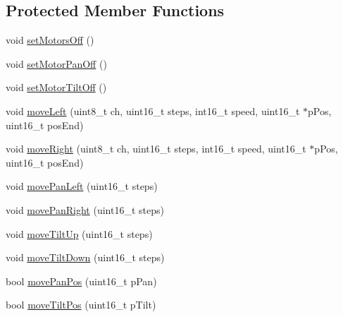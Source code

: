 \subsection*{Protected Member Functions}
\begin{DoxyCompactItemize}
\item 
void \hyperlink{classft_1_1_txt_pan_tilt_unit_a10a3340d1175128af17600aee6d208f5}{set\+Motors\+Off} ()
\item 
void \hyperlink{classft_1_1_txt_pan_tilt_unit_aa6e90052736e2260d5336e6e45625790}{set\+Motor\+Pan\+Off} ()
\item 
void \hyperlink{classft_1_1_txt_pan_tilt_unit_ae60c0c9c8e5a9f12b527d9c5c6c01e21}{set\+Motor\+Tilt\+Off} ()
\item 
void \hyperlink{classft_1_1_txt_pan_tilt_unit_a592992fb1f782c3a85bf43b2b812d1c1}{move\+Left} (uint8\+\_\+t ch, uint16\+\_\+t steps, int16\+\_\+t speed, uint16\+\_\+t $\ast$p\+Pos, uint16\+\_\+t pos\+End)
\item 
void \hyperlink{classft_1_1_txt_pan_tilt_unit_a6d00615d078b7fe284b08c50214ea9e8}{move\+Right} (uint8\+\_\+t ch, uint16\+\_\+t steps, int16\+\_\+t speed, uint16\+\_\+t $\ast$p\+Pos, uint16\+\_\+t pos\+End)
\item 
void \hyperlink{classft_1_1_txt_pan_tilt_unit_a947bff817236114544e5577d56c115b5}{move\+Pan\+Left} (uint16\+\_\+t steps)
\item 
void \hyperlink{classft_1_1_txt_pan_tilt_unit_ab44bf3e2be81f6d26a0dfc8f6f2b6483}{move\+Pan\+Right} (uint16\+\_\+t steps)
\item 
void \hyperlink{classft_1_1_txt_pan_tilt_unit_a8be0f85e285a511400a1e08f2dac2e26}{move\+Tilt\+Up} (uint16\+\_\+t steps)
\item 
void \hyperlink{classft_1_1_txt_pan_tilt_unit_a3e9951fe1f76c86af5ddf8c87d90d207}{move\+Tilt\+Down} (uint16\+\_\+t steps)
\item 
bool \hyperlink{classft_1_1_txt_pan_tilt_unit_a9439fd5d93222860f035d5c672d68573}{move\+Pan\+Pos} (uint16\+\_\+t p\+Pan)
\item 
bool \hyperlink{classft_1_1_txt_pan_tilt_unit_aead89c4a30fab6c23126e88b71caf943}{move\+Tilt\+Pos} (uint16\+\_\+t p\+Tilt)
\end{DoxyCompactItemize}
